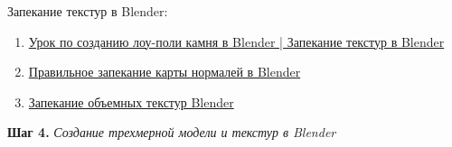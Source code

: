 \documentclass[a4paper,12pt]{article}
\begin{document}
    Запекание текстур в Blender:
    \begin{enumerate}
        
        \item \href{https://www.youtube.com/watch?v=mTWtVzgYyHE}{Урок по созданию лоу-поли камня в Blender | Запекание текстур в Blender}
        \item \href{https://www.youtube.com/watch?v=6f3Xdy_q7Bs}{Правильное запекание карты нормалей в Blender}
        \item \href{https://www.youtube.com/watch?v=R0KfJwV72dQ}{Запекание объемных текстур Blender}
    \end{enumerate}

    \textbf{Шаг 4.} \textit{Создание трехмерной модели и текстур в Blender}
    
\end{document}

